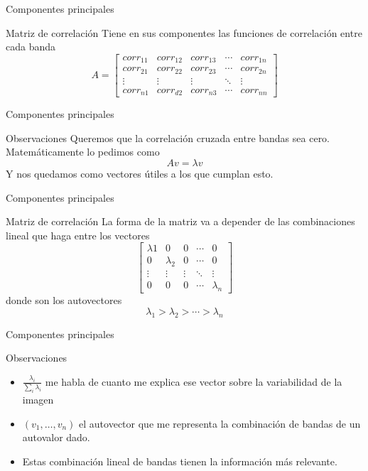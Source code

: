 \documentclass[handout]{beamer}
\begin{document}
\begin{frame}{Componentes principales}
  \begin{block}{Matriz de correlación}
    Tiene en sus componentes las funciones de correlación entre cada banda\pause
    \[
    A = \begin{bmatrix}
        corr_{11}       & corr_{12} & corr_{13} & \cdots & corr_{1n} \\
        corr_{21}       & corr_{22} & corr_{23} & \cdots & corr_{2n} \\
        \vdots          & \vdots    & \vdots    & \ddots & \vdots \\
        corr_{n1}       & corr_{d2} & corr_{n3} & \cdots & corr_{nn}
    \end{bmatrix} \]
  \end{block}
\end{frame}

\begin{frame}{Componentes principales}
  \begin{block}{Observaciones}
      Queremos que la correlación cruzada entre bandas sea cero.
      \pause\@ Matemáticamente lo pedimos como
        $$Av=\lambda v$$
      Y nos quedamos como vectores útiles a los que cumplan esto.
  \end{block}
\end{frame}

\begin{frame}{Componentes principales}
  \begin{block}{Matriz de correlación}
    La forma de la matriz va a depender de las combinaciones lineal que haga
      entre los vectores \pause\@
    \[\begin{bmatrix}
        \lambda{1}       & 0 & 0 & \cdots & 0 \\
        0       & \lambda_{2} & 0 & \cdots & 0 \\
        \vdots & \vdots & \vdots & \ddots & \vdots \\
        0       & 0 & 0 & \cdots & \lambda_{n}
    \end{bmatrix} \]
    \pause\@
    donde son los autovectores $$\lambda_{1}  > \lambda_{2} > \cdots > \lambda_{n}$$
  \end{block}
\end{frame}

\begin{frame}{Componentes principales}
  \begin{block}{Observaciones}
    \begin{itemize}[<+>]
      \item $\frac{\lambda_i}{\sum_i \lambda_i}$ me habla de cuanto me explica ese vector sobre la variabilidad de la imagen
      \item $(v_1 , \dots , v_n)$ el autovector que me representa la combinación de bandas de un autovalor dado.
      \item Estas combinación lineal de bandas tienen la información más relevante.
    \end{itemize}
  \end{block}
\end{frame}
\end{document}
